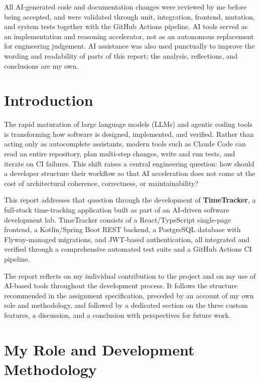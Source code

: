 \documentclass[11pt,a4paper]{article}
\begin{document}
All AI-generated code and documentation changes were reviewed by me before being accepted, and were validated through unit, integration, frontend, mutation, and system tests together with the GitHub Actions pipeline. AI tools served as an implementation and reasoning accelerator, not as an autonomous replacement for engineering judgement. AI assistance was also used punctually to improve the wording and readability of parts of this report; the analysis, reflections, and conclusions are my own.

\newpage

\tableofcontents
\newpage


\section{Introduction}

The rapid maturation of large language models (LLMs) and agentic coding tools is transforming how software is designed, implemented, and verified. Rather than acting only as autocomplete assistants, modern tools such as Claude Code can read an entire repository, plan multi-step changes, write and run tests, and iterate on CI failures. This shift raises a central engineering question: how should a developer structure their workflow so that AI acceleration does not come at the cost of architectural coherence, correctness, or maintainability?

This report addresses that question through the development of \textbf{TimeTracker}, a full-stack time-tracking application built as part of an AI-driven software development lab. TimeTracker consists of a React/TypeScript single-page frontend, a Kotlin/Spring Boot REST backend, a PostgreSQL database with Flyway-managed migrations, and JWT-based authentication, all integrated and verified through a comprehensive automated test suite and a GitHub Actions CI pipeline.

The report reflects on my individual contribution to the project and on my use of AI-based tools throughout the development process. It follows the structure recommended in the assignment specification, preceded by an account of my own role and methodology, and followed by a dedicated section on the three custom features, a discussion, and a conclusion with perspectives for future work.

\section{My Role and Development Methodology}
\end{document}
